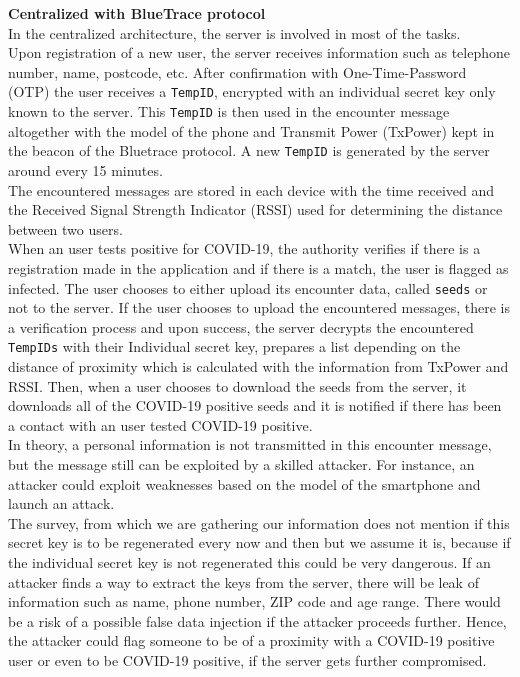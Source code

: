 \documentclass[a4paper, twocolumn]{article}
\begin{document}
\noindent \textbf{Centralized with BlueTrace protocol}\\
In the centralized architecture, the server is involved in most of the tasks.\\
Upon registration of a new user, the server receives information such as telephone number, name, postcode, etc. After confirmation with One-Time-Password (OTP) the user receives a \texttt{TempID}, encrypted with an individual secret key only known to the server. This \texttt{TempID} is then used in the encounter message altogether with the model of the phone and Transmit Power (TxPower) kept in the beacon of the Bluetrace protocol. A new \texttt{TempID} is generated by the server around every 15 minutes.\\
The encountered messages are stored in each device with the time received and the Received Signal Strength Indicator (RSSI) used for determining the distance between two users.\\
When an user tests positive for COVID-19, the authority verifies if there is a registration made in the application and if there is a match, the user is flagged as infected. The user chooses to either upload its encounter data, called \texttt{seeds} or not to the server. If the user chooses to upload the encountered messages, there is a verification process and upon success, the server decrypts the encountered \texttt{TempIDs} with their Individual secret key, prepares a list depending on the distance of proximity which is calculated with the information from TxPower and RSSI. Then, when a user chooses to download the seeds from the server, it downloads all of the COVID-19 positive seeds and it is notified if there has been a contact with an user tested COVID-19 positive.\\

\noindent In theory, a personal information is not transmitted in this encounter message, but the message still can be exploited by a skilled attacker. For instance, an attacker could exploit weaknesses based on the model of the smartphone and launch an attack.\\
The survey, from which we are gathering our information does not mention if this secret key is to be regenerated every now and then but we assume it is, because if the individual secret key is not regenerated this could be very dangerous. If an attacker finds a way to extract the keys from the server, there will be leak of information such as name, phone number, ZIP code and age range. There would be a risk of a possible false data injection if the attacker proceeds further. Hence, the attacker could flag someone to be of a proximity with a COVID-19 positive user or even to be COVID-19 positive, if the server gets further compromised.\\
\end{document}
